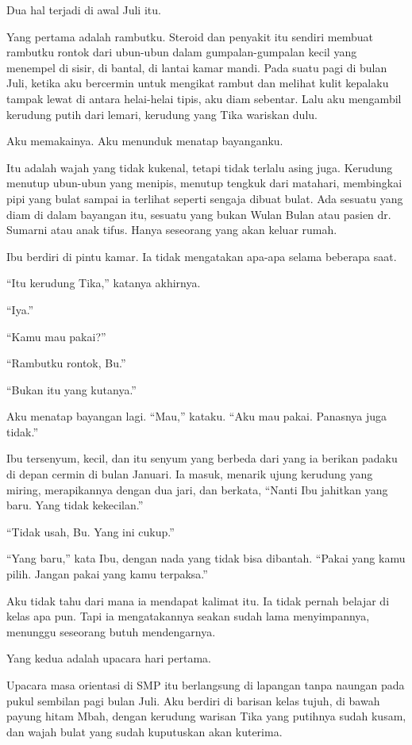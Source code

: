 \documentclass[11pt,twoside,openany]{book}
\makeatletter
\newcommand{\scenebreak}{\par\vspace{0.9em}{\centering\textsc{*\hspace{0.7em}*\hspace{0.7em}*}\par}\vspace{0.9em}\@afterindentfalse\@afterheading}
\makeatother
\begin{document}
Dua hal terjadi di awal Juli itu.

Yang pertama adalah rambutku. Steroid dan penyakit itu sendiri membuat rambutku rontok dari ubun-ubun dalam gumpalan-gumpalan kecil yang menempel di sisir, di bantal, di lantai kamar mandi. Pada suatu pagi di bulan Juli, ketika aku bercermin untuk mengikat rambut dan melihat kulit kepalaku tampak lewat di antara helai-helai tipis, aku diam sebentar. Lalu aku mengambil kerudung putih dari lemari, kerudung yang Tika wariskan dulu.

Aku memakainya. Aku menunduk menatap bayanganku.

Itu adalah wajah yang tidak kukenal, tetapi tidak terlalu asing juga. Kerudung menutup ubun-ubun yang menipis, menutup tengkuk dari matahari, membingkai pipi yang bulat sampai ia terlihat seperti sengaja dibuat bulat. Ada sesuatu yang diam di dalam bayangan itu, sesuatu yang bukan Wulan Bulan atau pasien dr. Sumarni atau anak tifus. Hanya seseorang yang akan keluar rumah.

Ibu berdiri di pintu kamar. Ia tidak mengatakan apa-apa selama beberapa saat.

``Itu kerudung Tika,'' katanya akhirnya.

``Iya.''

``Kamu mau pakai?''

``Rambutku rontok, Bu.''

``Bukan itu yang kutanya.''

Aku menatap bayangan lagi. ``Mau,'' kataku. ``Aku mau pakai. Panasnya juga tidak.''

Ibu tersenyum, kecil, dan itu senyum yang berbeda dari yang ia berikan padaku di depan cermin di bulan Januari. Ia masuk, menarik ujung kerudung yang miring, merapikannya dengan dua jari, dan berkata, ``Nanti Ibu jahitkan yang baru. Yang tidak kekecilan.''

``Tidak usah, Bu. Yang ini cukup.''

``Yang baru,'' kata Ibu, dengan nada yang tidak bisa dibantah. ``Pakai yang kamu pilih. Jangan pakai yang kamu terpaksa.''

Aku tidak tahu dari mana ia mendapat kalimat itu. Ia tidak pernah belajar di kelas apa pun. Tapi ia mengatakannya seakan sudah lama menyimpannya, menunggu seseorang butuh mendengarnya.

\scenebreak
Yang kedua adalah upacara hari pertama.

Upacara masa orientasi di SMP itu berlangsung di lapangan tanpa naungan pada pukul sembilan pagi bulan Juli. Aku berdiri di barisan kelas tujuh, di bawah payung hitam Mbah, dengan kerudung warisan Tika yang putihnya sudah kusam, dan wajah bulat yang sudah kuputuskan akan kuterima.
\end{document}

